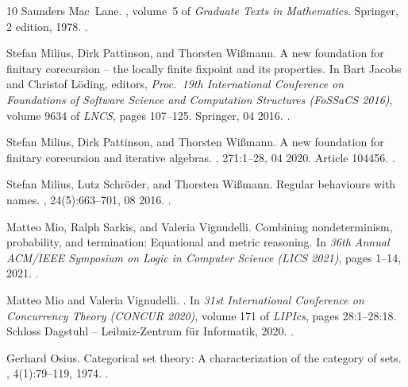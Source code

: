 \documentclass[10pt,a4paper]{article}
\theoremstyle{definition}
\theoremstyle{remark}
\numberwithin{equation}{section}
\theoremstyle{plain}
\theoremstyle{definition}
\begin{document}
\begin{thebibliography}{10}
Saunders Mac~Lane.
, volume~5 of {\em
  Graduate {{Texts}} in {{Mathematics}}}.
\newblock Springer, 2 edition, 1978.
\newblock \href {https://doi.org/10.1007/978-1-4757-4721-8}
  {}.

Stefan Milius, Dirk Pattinson, and Thorsten Wi{\ss}mann.
\newblock A new foundation for finitary corecursion -- the locally finite
  fixpoint and its properties.
\newblock In Bart Jacobs and Christof L{\"{o}}ding, editors, {\em Proc.~19th
  International Conference on Foundations of Software Science and Computation
  Structures (FoSSaCS 2016)}, volume 9634 of {\em LNCS}, pages 107--125.
  Springer, 04 2016.
\newblock \href {https://doi.org/10.1007/978-3-662-49630-5_7}
  {}.

Stefan Milius, Dirk Pattinson, and Thorsten Wi{\ss}mann.
\newblock A new foundation for finitary corecursion and iterative algebras.
, 271:1--28, 04 2020.
\newblock Article 104456.
\newblock \href {https://doi.org/10.1016/j.ic.2019.104456}
  {}.

Stefan Milius, Lutz Schr{\"{o}}der, and Thorsten Wi{\ss}mann.
\newblock Regular behaviours with names.
, 24(5):663--701, 08 2016.
\newblock \href {https://doi.org/10.1007/s10485-016-9457-8}
  {}.

Matteo Mio, Ralph Sarkis, and Valeria Vignudelli.
\newblock Combining nondeterminism, probability, and termination: Equational
  and metric reasoning.
\newblock In {\em 36th Annual ACM/IEEE Symposium on Logic in Computer Science
  (LICS 2021)}, pages 1--14, 2021.
\newblock \href {https://doi.org/10.1109/LICS52264.2021.9470717}
  {}.

Matteo Mio and Valeria Vignudelli.
.
\newblock In {\em 31st International Conference on Concurrency Theory (CONCUR
  2020)}, volume 171 of {\em LIPIcs}, pages 28:1--28:18. Schloss Dagstuhl --
  Leibniz-Zentrum f{\"u}r Informatik, 2020.
\newblock \href {https://doi.org/10.4230/LIPIcs.CONCUR.2020.28}
  {}.

Gerhard Osius.
\newblock Categorical set theory: A characterization of the category of sets.
, 4(1):79--119, 1974.
\newblock \href {https://doi.org/10.1016/0022-4049(74)90032-2}
  {}.


\end{thebibliography}
\end{document}
